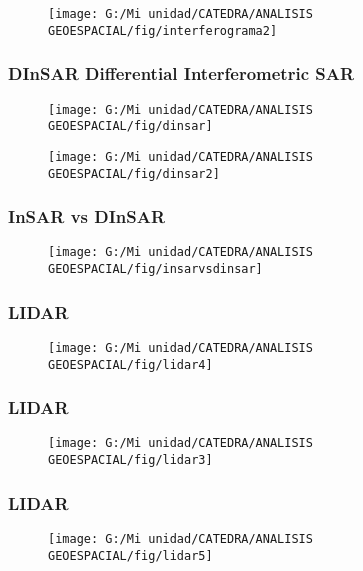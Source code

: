 \documentclass[14pt]{beamer}
\begin{document}
\begin{frame}
 \begin{figure}
    \centering
    \texttt{[image: G:/Mi unidad/CATEDRA/ANALISIS GEOESPACIAL/fig/interferograma2]}
  \end{figure}
\end{frame}
\begin{frame}
\frametitle{DInSAR Differential Interferometric SAR}
 \begin{figure}
    \centering
    \texttt{[image: G:/Mi unidad/CATEDRA/ANALISIS GEOESPACIAL/fig/dinsar]}
  \end{figure}
\end{frame}
\begin{frame}
 \begin{figure}
    \centering
    \texttt{[image: G:/Mi unidad/CATEDRA/ANALISIS GEOESPACIAL/fig/dinsar2]}
  \end{figure}
\end{frame}
\begin{frame}
\frametitle{InSAR vs DInSAR}
 \begin{figure}
    \centering
    \texttt{[image: G:/Mi unidad/CATEDRA/ANALISIS GEOESPACIAL/fig/insarvsdinsar]}
  \end{figure}
\end{frame}
\begin{frame}
\frametitle{LIDAR}
 \begin{figure}
    \centering
    \texttt{[image: G:/Mi unidad/CATEDRA/ANALISIS GEOESPACIAL/fig/lidar4]}
  \end{figure}
\end{frame}
\begin{frame}
\frametitle{LIDAR}
 \begin{figure}
    \centering
    \texttt{[image: G:/Mi unidad/CATEDRA/ANALISIS GEOESPACIAL/fig/lidar3]}
  \end{figure}
\end{frame}
\begin{frame}
\frametitle{LIDAR}
 \begin{figure}
    \centering
    \texttt{[image: G:/Mi unidad/CATEDRA/ANALISIS GEOESPACIAL/fig/lidar5]}
  \end{figure}
\end{frame}
\end{document}
